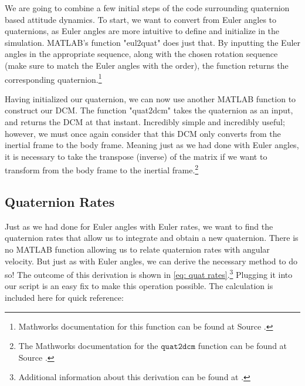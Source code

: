 \documentclass[10pt, openany, titlepage]{book}
\theoremstyle{definition}
\begin{document}
We are going to combine a few initial steps of the code surrounding \gls{quaternion} based attitude dynamics. To start, we want to convert from \gls{Euler angles} to \glspl{quaternion}, as \gls{Euler angles} are more intuitive to define and initialize in the simulation. MATLAB's function "eul2quat" does just that. By inputting the \gls{Euler angles} in the appropriate sequence, along with the chosen rotation sequence (make sure to match the \gls{Euler angles} with the order), the function returns the corresponding \gls{quaternion}.\footnote{Mathworks documentation for this function can be found at Source \cite{mathworks_eul2quat_nodate}.}

Having initialized our \gls{quaternion}, we can now use another MATLAB function to construct our DCM. The function "quat2dcm" takes the \gls{quaternion} as an input, and returns the DCM at that instant. Incredibly simple and incredibly useful; however, we must once again consider that this DCM only converts from the \gls{inertial frame} to the \gls{body frame}. Meaning just as we had done with \gls{Euler angles}, it is necessary to take the transpose (inverse) of the matrix if we want to transform from the \gls{body frame} to the \gls{inertial frame}.\footnote{The Mathworks documentation for the $\texttt{quat2dcm}$ function can be found at Source \cite{mathworks_quat2dcm_nodate}.}

\subsection{Quaternion Rates}\label{sec: quaternion rates}

Just as we had done for \gls{Euler angles} with \gls{Euler rates}, we want to find the \gls{quaternion} rates that allow us to integrate and obtain a new \gls{quaternion}. There is no MATLAB function allowing us to relate \gls{quaternion} rates with angular velocity. But just as with \gls{Euler angles}, we can derive the necessary method to do so! The outcome of this derivation is shown in \eqref{eq: quat rates}.\footnote{Additional information about this derivation can be found at \cite{narayan_how_2017}.} Plugging it into our script is an easy fix to make this operation possible. The calculation is included here for quick reference:
\end{document}
